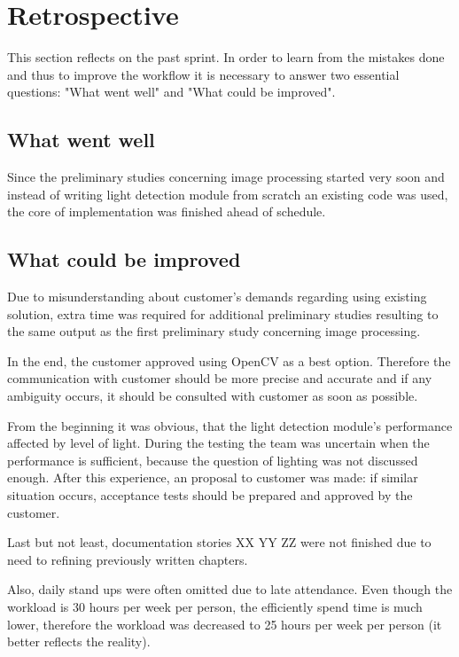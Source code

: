 \section{Retrospective}
This section reflects on the past sprint. In order to learn from the mistakes done and thus to improve the workflow it is necessary to answer two essential questions: "What went well" and "What could be improved".

\subsection{What went well}
Since the preliminary studies concerning image processing started very soon and instead of writing light detection module from scratch an existing code was used, the core of implementation was finished ahead of schedule.

\subsection{What could be improved}
Due to misunderstanding about customer's demands regarding using existing solution, extra time was required for additional preliminary studies resulting to the same output as the first preliminary study concerning image processing. 

In the end, the customer approved using OpenCV as a best option.
Therefore the communication with customer should be more precise and accurate and if any ambiguity occurs, it should be consulted with customer as soon as possible.

From the beginning it was obvious, that the light detection module's performance affected by level of light.
During the testing the team was uncertain when the performance is sufficient, because the question of lighting was not discussed enough.
After this experience, an proposal to customer was made: if similar situation occurs, acceptance tests should be prepared and approved by the customer.

Last but not least, documentation stories XX YY ZZ were not finished due to need to refining previously written chapters.

Also, daily stand ups were often omitted due to late attendance.
Even though the workload is 30 hours per week per person, the efficiently spend time is much lower, therefore the workload was decreased to 25 hours per week per person (it better reflects the reality).
